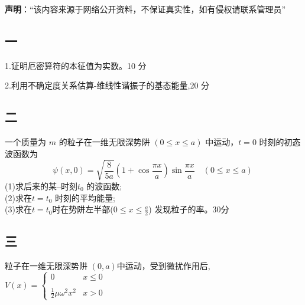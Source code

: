 
\textbf{声明}：“该内容来源于网络公开资料，不保证真实性，如有侵权请联系管理员”

\subsection{一}
1.证明厄密算符的本征值为实数。10 分

2.利用不确定度关系估算-维线性谐振子的基态能量,20 分

\subsection{二}
一个质量为 $m$ 的粒子在一维无限深势阱 $ (0 \leq x \leq a) $ 中运动，$t = 0$ 时刻的初态波函数为
$$\psi(x, 0) = \sqrt{\frac{8}{5a}} (1 + \cos \frac{\pi x}{a}) \sin \frac{\pi x}{a} \quad (0 \leq x \leq a)~$$ 
(1)求后来的某--时刻$t_0$ 的波函数;\\
(2)求在$t=t_0$ 时刻的平均能量;\\
(3)求在$t=t_0$时在势阱左半部($0\leq  x \leq \frac{a}{2}$) 发现粒子的率。30分

\subsection{三}
粒子在一维无限深势阱 $(0,a)$中运动，受到微扰作用后,
$V(x) = \begin{cases} 0 & x \leq 0 \\\\ \frac{1}{2}\mu \omega^2 x^2 & x > 0 \end{cases}$